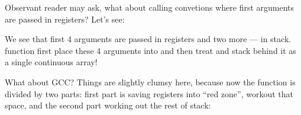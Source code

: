 Observant reader may ask, what about calling convetions where first arguments are passed in registers?
Let's see:



We see that first 4 arguments are passed in registers and two more --- in stack.
 function first place these 4 arguments into  and then treat
 and stack behind it as a single continuous array!

What about GCC? Things are slightly clumsy here, because now the function is divided by two parts:
first part is saving registers into ``red zone'', workout that space, and the second part working out
the rest of stack:


